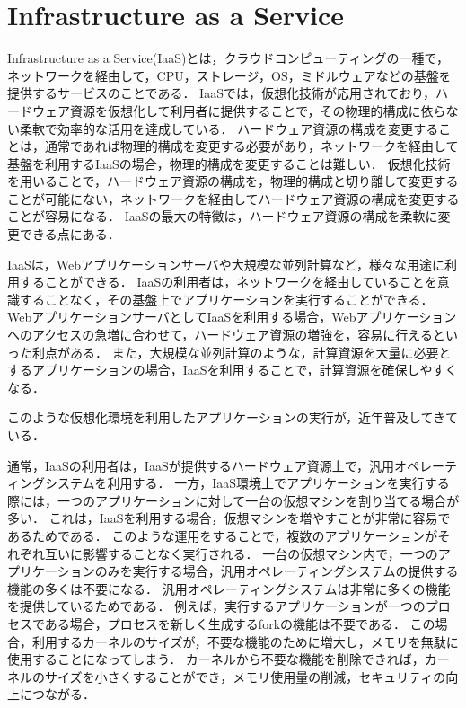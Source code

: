 \documentclass[graduation-thesis]{mlarticle}
\begin{document}
\clearpage
\section{Infrastructure as a Service}
Infrastructure as a Service(IaaS)とは，クラウドコンピューティングの一種で，ネットワークを経由して，CPU，ストレージ，OS，ミドルウェアなどの基盤を提供するサービスのことである．
IaaSでは，仮想化技術が応用されており，ハードウェア資源を仮想化して利用者に提供することで，その物理的構成に依らない柔軟で効率的な活用を達成している．
ハードウェア資源の構成を変更することは，通常であれば物理的構成を変更する必要があり，ネットワークを経由して基盤を利用するIaaSの場合，物理的構成を変更することは難しい．
仮想化技術を用いることで，ハードウェア資源の構成を，物理的構成と切り離して変更することが可能にない，ネットワークを経由してハードウェア資源の構成を変更することが容易になる．
IaaSの最大の特徴は，ハードウェア資源の構成を柔軟に変更できる点にある．

IaaSは，Webアプリケーションサーバや大規模な並列計算など，様々な用途に利用することができる．
IaaSの利用者は，ネットワークを経由していることを意識することなく，その基盤上でアプリケーションを実行することができる．
WebアプリケーションサーバとしてIaaSを利用する場合，Webアプリケーションへのアクセスの急増に合わせて，ハードウェア資源の増強を，容易に行えるといった利点がある．
また，大規模な並列計算のような，計算資源を大量に必要とするアプリケーションの場合，IaaSを利用することで，計算資源を確保しやすくなる．

このような仮想化環境を利用したアプリケーションの実行が，近年普及してきている．

通常，IaaSの利用者は，IaaSが提供するハードウェア資源上で，汎用オペレーティングシステムを利用する．
一方，IaaS環境上でアプリケーションを実行する際には，一つのアプリケーションに対して一台の仮想マシンを割り当てる場合が多い．
これは，IaaSを利用する場合，仮想マシンを増やすことが非常に容易であるためである．
このような運用をすることで，複数のアプリケーションがそれぞれ互いに影響することなく実行される．
一台の仮想マシン内で，一つのアプリケーションのみを実行する場合，汎用オペレーティングシステムの提供する機能の多くは不要になる．
汎用オペレーティングシステムは非常に多くの機能を提供しているためである．
例えば，実行するアプリケーションが一つのプロセスである場合，プロセスを新しく生成するforkの機能は不要である．
この場合，利用するカーネルのサイズが，不要な機能のために増大し，メモリを無駄に使用することになってしまう．
カーネルから不要な機能を削除できれば，カーネルのサイズを小さくすることができ，メモリ使用量の削減，セキュリティの向上につながる．
\end{document}
